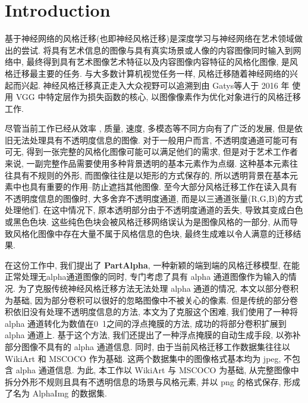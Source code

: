 \section{Introduction}

基于神经网络的风格迁移(也即神经风格迁移)是深度学习与神经网络在艺术领域做出的尝试. 将具有艺术信息的图像与具有真实场景或人像的内容图像同时输入到网络中, 最终得到具有艺术图像艺术特征以及内容图像内容特征的风格化图像, 是风格迁移最主要的任务.
与大多数计算机视觉任务一样, 风格迁移随着神经网络的兴起而兴起. 神经风格迁移真正走入大众视野可以追溯到由 Gatys等人\cite{gatys2016image}于 2016 年 使用 VGG 中特定层作为损失函数的核心, 以图像像素作为优化对象进行的风格迁移工作. 

尽管当前工作已经从效率 \cite{huang2017arbitrary}, 质量\cite{}, 速度\cite{zhang2024artbank}, 多模态\cite{ahn2024dreamstyler}等不同方向有了广泛的发展, 但是依旧无法处理具有不透明度信息的图像. 对于一般用户而言, 不透明度通道可能可有可无, 得到一张完整的风格化图像可能可以满足他们的需求, 但是对于艺术工作者来说, 一副完整作品需要使用多种背景透明的基本元素作为点缀. 这种基本元素往往具有不规则的外形, 而图像往往是以矩形的方式保存的, 所以透明背景在基本元素中也具有重要的作用--防止遮挡其他图像.
至今大部分风格迁移工作\cite{johnson2016perceptual,risser2017stable,sanakoyeu2018style,jing2019neural,goodfellow2020generative,li2023frequency,ke2023neural,fu2023neural,tang2022few}在读入具有不透明度信息的图像时, 大多舍弃不透明度通道, 而是以三通道张量(R,G,B)的方式处理他们. 在这中情况下, 原本透明部分由于不透明度通道的丢失, 导致其变成白色或黑色色块. 这些纯色色块会被风格迁移网络误认为是图像风格的一部分, 从而导致风格化图像中存在大量不属于风格信息的色块, 最终生成难以令人满意的迁移结果.

在这份工作中, 我们提出了 \textbf{PartAlpha}, 一种新颖的端到端的风格迁移模型, 在能正常处理无alpha通道图像的同时, 专门考虑了具有 alpha 通道图像作为输入的情况. 为了克服传统神经风格迁移方法无法处理 alpha 通道的情况, 本文以部分卷积\cite{liu2022partial}为基础, 因为部分卷积可以很好的忽略图像中不被关心的像素. 但是传统的部分卷积依旧没有处理不透明度信息的方法, 本文为了克服这个困难, 我们使用了一种将 alpha 通道转化为数值在0~1之间的浮点掩膜的方法, 成功的将部分卷积扩展到 alpha 通道上. 基于这个方法, 我们还提出了一种浮点掩膜的自动生成手段, 以弥补部分图像不具有的 alpha 通道信息. 
同时, 由于当前风格迁移工作数据集往往以 WikiArt\cite{wikiartWikiArtorgVisual} 和 MSCOCO\cite{cocodatasetCOCOCommon} 作为基础. 这两个数据集中的图像格式基本均为 jpeg, 不包含 alpha 通道信息. 为此, 本工作以 WikiArt 与 MSCOCO 为基础, 从完整图像中拆分外形不规则且具有不透明信息的场景与风格元素, 并以 png 的格式保存, 形成了名为 AlphaImg 的数据集.